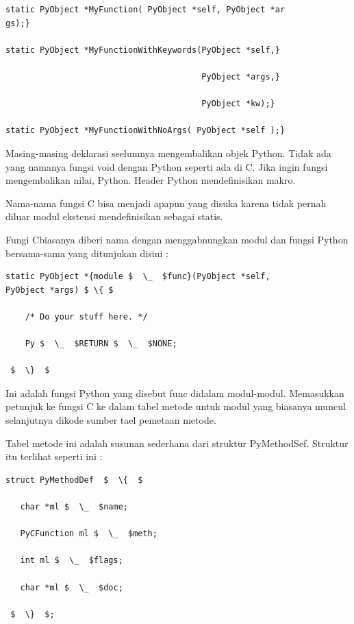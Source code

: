 \begin{verbatim}
static PyObject *MyFunction( PyObject *self, PyObject *ar
gs);} 
 
static PyObject *MyFunctionWithKeywords(PyObject *self,} 

                                        PyObject *args,} 

                                        PyObject *kw);} 
                                        
static PyObject *MyFunctionWithNoArgs( PyObject *self );} 
\end{verbatim}

\vspace{12pt}
\hspace*{0.5in} Masing-masing deklarasi seelumnya mengembalikan objek Python. Tidak ada yang namanya fungsi void dengan Python seperti ada di C. Jika ingin fungsi mengembalikan nilai, Python. Header Python mendefinisikan makro.  

\hspace*{0.5in} Nama-nama fungsi C bisa menjadi apapun yang disuka karena tidak pernah diluar modul ekstensi mendefinisikan sebagai statis. 

\hspace*{0.5in} Fungi Cbiasanya diberi nama dengan menggabnungkan modul dan fungsi Python bersama-sama yang ditunjukan disini : 


\begin{verbatim}
static PyObject *{module $  \_  $func}(PyObject *self, 
PyObject *args) $ \{ $ 

    /* Do your stuff here. */ 

    Py $  \_  $RETURN $  \_  $NONE; 

 $  \}  $ 
\end{verbatim}

\vspace{12pt}
\hspace*{0.5in} Ini adalah fungsi Python yang disebut func didalam modul-modul. Memasukkan petunjuk ke fungsi C ke dalam tabel metode untuk modul yang biasanya muncul selanjutnya dikode sumber tael pemetaan metode. 

\hspace*{0.5in} Tabel metode ini adalah susunan sederhana dari struktur PyMethodSef. Struktur itu terlihat seperti ini : 

\begin{verbatim}
struct PyMethodDef  $  \{  $ 
 
   char *ml $  \_  $name; 
 
   PyCFunction ml $  \_  $meth; 

   int ml $  \_  $flags; 
 
   char *ml $  \_  $doc; 

 $  \}  $; 
\end{verbatim}

